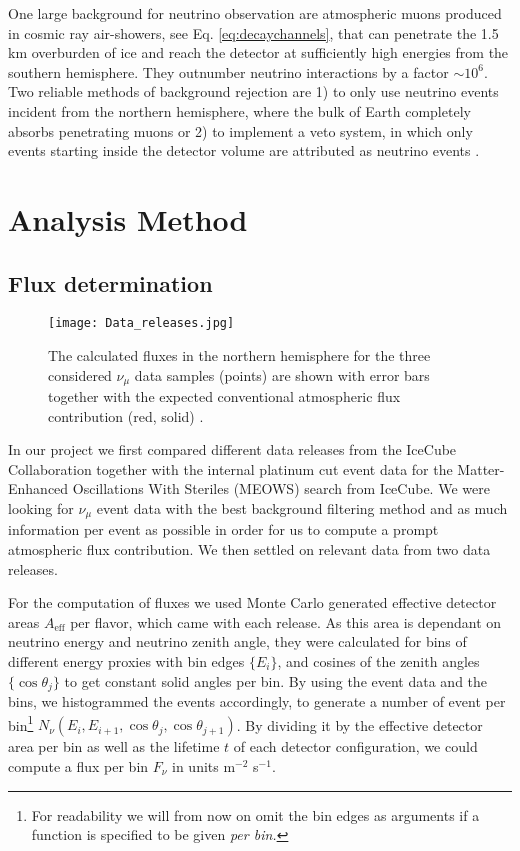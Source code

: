 \documentclass[%
 reprint,
 preprintnumbers,
 nofootinbib,
 amsmath,amssymb,
 aps,
]{revtex4-2}
\begin{document}
One large background for neutrino observation are atmospheric muons produced in cosmic ray air-showers, see Eq. \ref{eq:decaychannels}, that can penetrate the 1.5 km overburden of ice and reach the detector at sufficiently high energies from the southern hemisphere. They outnumber neutrino interactions by a factor $\sim 10^6$. Two reliable methods of background rejection are 1) to only use neutrino events incident from the northern hemisphere, where the bulk of Earth completely absorbs penetrating muons or 2) to implement a veto system, in which only events starting inside the detector volume are attributed as neutrino events \cite{greater1TeV,2yearAstro}.

\section{\label{sec:level3}Analysis Method}
\subsection{Flux determination}

\begin{figure}[h]
	\centering
	\texttt{[image: Data\_releases.jpg]}
	\caption{\label{fig:DataSamples} The calculated fluxes in the northern hemisphere for the three considered $\nu_\mu$ data samples (points) are shown with error bars together with the expected conventional atmospheric flux contribution (red, solid) \cite{Honda_2007,2yearAstro}.}
\end{figure}

In our project we first compared different data releases from the IceCube Collaboration \cite{website} together with the internal platinum cut event data for the Matter-Enhanced Oscillations With Steriles (MEOWS) search from IceCube. We were looking for $\nu_\mu$ event data with the best background filtering method and as much information per event as possible in order for us to compute a prompt atmospheric flux contribution. We then settled on relevant data from two data releases.

For the computation of fluxes we used Monte Carlo generated effective detector areas $A_{\text{eff}}$ per flavor, which came with each release. As this area is dependant on neutrino energy and neutrino zenith angle, they were calculated for bins of different energy proxies with bin edges $\{E_i\}$, and cosines of the zenith angles $\{\cos\theta_j\}$ to get constant solid angles per bin. By using the event data and the bins, we histogrammed the events accordingly, to generate a number of event per bin\footnote{For readability we will from now on omit the bin edges as arguments if a function is specified to be given \emph{per bin.}} $N_\nu(E_i,E_{i+1},\cos\theta_j,\cos\theta_{j+1})$. By dividing it by the effective detector area per bin as well as the lifetime $t$ of each detector configuration, we could compute a flux per bin $F_\nu$ in units m$^{-2}$ s$^{-1}$.
\end{document}
